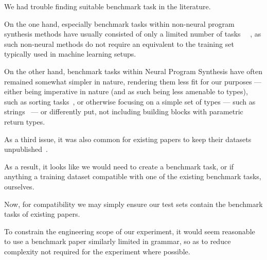 \documentclass{article}
\begin{document}
We had trouble finding suitable benchmark task in the literature.

On the one hand, especially benchmark tasks within non-neural program synthesis methods have usually consisted of only a limited number of tasks%
~\citep{myth,lambda2,typedmil,houdini,tamandu,dilp}~\cite{terpret},
as such non-neural methods do not require an equivalent to the training set typically used in machine learning setups.

On the other hand, benchmark tasks within Neural Program Synthesis have often remained somewhat simpler in nature,
rendering them less fit for our purposes --- either being imperative in nature (and as such being less amenable to types),
such as sorting tasks~\citep{npi,alphanpi},
or otherwise focusing on a simple set of types --- such as strings~\citep{nsps} ---%
or differently put, not including building blocks with parametric return types.

As a third issue, it was also common for existing papers to keep their datasets unpublished~\citep{nsps,deepcoder}.


As a result, it looks like we would need to create a benchmark task, or if anything a training dataset compatible with one of the existing benchmark tasks, ourselves.

Now, for compatibility we may simply ensure our test sets contain the benchmark tasks of existing papers.

To constrain the engineering scope of our experiment, it would seem reasonable to use a benchmark paper similarly limited in grammar, so as to reduce complexity not required for the experiment where possible.
\end{document}
